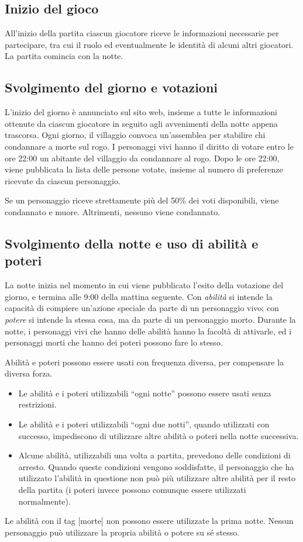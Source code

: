 \documentclass[a4paper,10pt]{article}
\begin{document}
\subsection{Inizio del gioco}

All'inizio della partita ciascun giocatore riceve le informazioni necessarie per partecipare, tra cui il ruolo ed eventualmente le identità di alcuni altri giocatori. La partita comincia con la notte.


\subsection{Svolgimento del giorno e votazioni}

L'inizio del giorno è annunciato sul sito web, insieme a tutte le informazioni ottenute da ciascun giocatore in seguito agli avvenimenti della notte appena trascorsa. Ogni giorno, il villaggio convoca un'assemblea per stabilire chi condannare a morte sul rogo. I personaggi vivi hanno il diritto di votare entro le ore 22:00 un abitante del villaggio da condannare al rogo. Dopo le ore 22:00, viene pubblicata la lista delle persone votate, insieme al numero di preferenze ricevute da ciascun personaggio.

Se un personaggio riceve strettamente più del 50\% dei voti disponibili, viene condannato e muore. Altrimenti, nessuno viene condannato.

\subsection{Svolgimento della notte e uso di abilità e poteri}

La notte inizia nel momento in cui viene pubblicato l'esito della votazione del giorno, e termina alle 9:00 della mattina seguente. Con \emph{abilità} si intende la capacità di compiere un'azione speciale da parte di un personaggio vivo; con \emph{potere} si intende la stessa cosa, ma da parte di un personaggio morto. Durante la notte, i personaggi vivi che hanno delle abilità hanno la facoltà di attivarle, ed i personaggi morti che hanno dei poteri possono fare lo stesso.

Abilità e poteri possono essere usati con frequenza diversa, per compensare la diversa forza.
\begin{itemize}
    \item Le abilità e i poteri utilizzabili ``ogni notte'' possono essere usati senza restrizioni.
    \item Le abilità e i poteri utilizzabili ``ogni due notti'', quando utilizzati con successo, impediscono di utilizzare altre abilità o poteri nella notte successiva.
    \item Alcune abilità, utilizzabili una volta a partita, prevedono delle condizioni di arresto. Quando queste condizioni vengono soddisfatte, il personaggio che ha utilizzato l'abilità in questione non può più utilizzare altre abilità per il resto della partita (i poteri invece possono comunque essere utilizzati normalmente).
\end{itemize}
Le abilità con il tag [morte] non possono essere utilizzate la prima notte. Nessun personaggio può utilizzare la propria abilità o potere su sé stesso.
\end{document}
